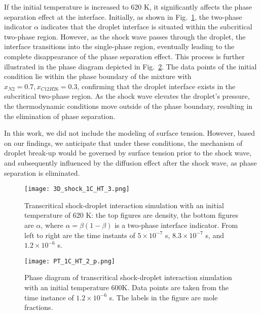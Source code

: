If the initial temperature is increased to 620 K, it significantly affects the phase separation effect at the interface. Initially, as shown in Fig.~\ref{droplet_3d_1C_HT}, the two-phase indicator $\alpha$ indicates that the droplet interface is situated within the subcritical two-phase region. However, as the shock wave passes through the droplet, the interface transitions into the single-phase region, eventually leading to the complete disappearance of the phase separation effect. This process is further illustrated in the phase diagram depicted in Fig.~\ref{droplet_3D_1C_HT_phasediagram}. The data points of the initial condition lie within the phase boundary of the mixture with $x_{N2}=0.7, x_{C12H26}=0.3$, confirming that the droplet interface exists in the subcritical two-phase region. As the shock wave elevates the droplet's pressure, the thermodynamic conditions move outside of the phase boundary, resulting in the elimination of phase separation. 

In this work, we did not include the modeling of surface tension. However, based on our findings, we anticipate that under these conditions, the mechanism of droplet break-up would be governed by surface tension prior to the shock wave, and subsequently influenced by the diffusion effect after the shock wave, as phase separation is eliminated.




\begin{figure}[htbp]
\centering
\texttt{[image: 3D\_shock\_1C\_HT\_3.png]}
\caption{Transcritical shock-droplet interaction simulation with an initial temperature of 620 K: the top figures are density, the bottom figures are $\alpha$, where $\alpha = \beta (1-\beta)$ is a two-phase interface indicator. From left to right are the time instants of $5\times 10^{-7}$ s, $8.3\times 10^{-7}$ s, and $1.2\times 10^{-6}$ s.}
\label{droplet_3d_1C_HT} 
\end{figure}


\begin{figure}[htbp]
\centering
\texttt{[image: PT\_1C\_HT\_2\_p.png]}
\caption{Phase diagram of transcritical shock-droplet interaction simulation with an initial temperature 600K. Data points are taken from the time instance of $1.2\times 10^{-6}$ s. The labels in the figure are mole fractions.}
\label{droplet_3D_1C_HT_phasediagram} 
\end{figure}

